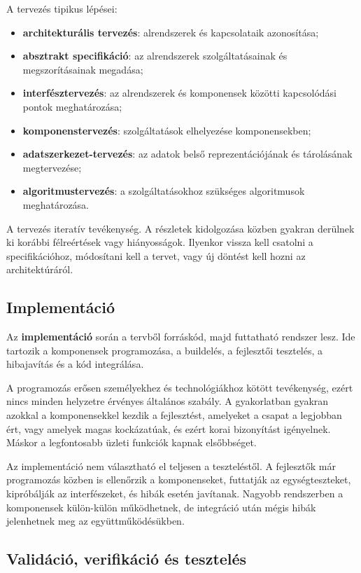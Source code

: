 A tervezés tipikus lépései:

\begin{itemize}
  \item \textbf{architekturális tervezés}: alrendszerek és kapcsolataik azonosítása;
  \item \textbf{absztrakt specifikáció}: az alrendszerek szolgáltatásainak és megszorításainak megadása;
  \item \textbf{interfésztervezés}: az alrendszerek és komponensek közötti kapcsolódási pontok meghatározása;
  \item \textbf{komponenstervezés}: szolgáltatások elhelyezése komponensekben;
  \item \textbf{adatszerkezet-tervezés}: az adatok belső reprezentációjának és tárolásának megtervezése;
  \item \textbf{algoritmustervezés}: a szolgáltatásokhoz szükséges algoritmusok meghatározása.
\end{itemize}

A tervezés iteratív tevékenység. A részletek kidolgozása közben gyakran derülnek ki korábbi félreértések vagy hiányosságok. Ilyenkor vissza kell csatolni a specifikációhoz, módosítani kell a tervet, vagy új döntést kell hozni az architektúráról.

\subsection{Implementáció}

Az \textbf{implementáció} során a tervből forráskód, majd futtatható rendszer lesz. Ide tartozik a komponensek programozása, a buildelés, a fejlesztői tesztelés, a hibajavítás és a kód integrálása.

A programozás erősen személyekhez és technológiákhoz kötött tevékenység, ezért nincs minden helyzetre érvényes általános szabály. A gyakorlatban gyakran azokkal a komponensekkel kezdik a fejlesztést, amelyeket a csapat a legjobban ért, vagy amelyek magas kockázatúak, és ezért korai bizonyítást igényelnek. Máskor a legfontosabb üzleti funkciók kapnak elsőbbséget.

Az implementáció nem választható el teljesen a teszteléstől. A fejlesztők már programozás közben is ellenőrzik a komponenseket, futtatják az egységteszteket, kipróbálják az interfészeket, és hibák esetén javítanak. Nagyobb rendszerben a komponensek külön-külön működhetnek, de integráció után mégis hibák jelenhetnek meg az együttműködésükben.

\subsection{Validáció, verifikáció és tesztelés}

